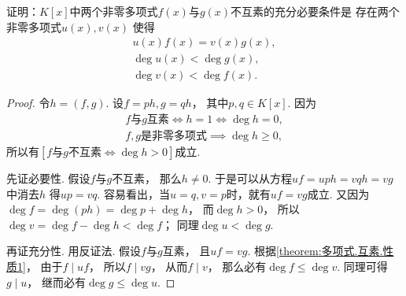 \begin{example}
证明：\(K[x]\)中两个非零多项式\(f(x)\)与\(g(x)\)不互素的充分必要条件是
存在两个非零多项式\(u(x),v(x)\)
使得\begin{gather*}
	u(x) f(x) = v(x) g(x), \\
	\deg u(x) < \deg g(x), \\
	\deg v(x) < \deg f(x).
\end{gather*}
\begin{proof}
令\(h=(f,g)\).
设\(f = ph,
g = qh\)，
其中\(p,q \in K[x]\).
因为\begin{gather*}
	\text{$f$与$g$互素}
	\iff
	h=1
	\iff
	\deg h=0, \\
	\text{$f,g$是非零多项式}
	\implies
	\deg h\geq0,
\end{gather*}
所以有\([\text{$f$与$g$不互素}
\iff
\deg h>0]\)成立.

先证必要性.
假设\(f\)与\(g\)不互素，
那么\(h\neq0\).
于是可以从方程\(
	uf
	= uph
	= vqh
	= vg
\)中消去\(h\)
得\(up=vq\).
容易看出，当\(u=q,v=p\)时，就有\(uf=vg\)成立.
又因为\(\deg f=\deg(ph)=\deg p+\deg h\)，
而\(\deg h>0\)，
所以\(\deg v=\deg f-\deg h<\deg f\)；
同理\(\deg u<\deg g\).

再证充分性.
用反证法.
假设\(f\)与\(g\)互素，
且\(uf=vg\).
根据\cref{theorem:多项式.互素.性质1}，
由于\(f \mid uf\)，
所以\(f \mid vg\)，
从而\(f \mid v\)，
那么必有\(\deg f \leq \deg v\).
同理可得\(g \mid u\)，
继而必有\(\deg g \leq \deg u\).
\end{proof}
\end{example}
